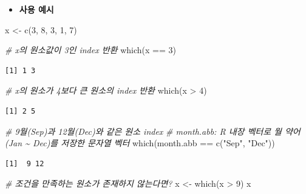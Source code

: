 \documentclass[
  11pt,
]{krantz}
\newenvironment{Shaded}{\begin{snugshade}}{\end{snugshade}}
\newcommand{\CommentTok}[1]{\textcolor[rgb]{0.37,0.37,0.37}{\textit{#1}}}
\newcommand{\DecValTok}[1]{\textcolor[rgb]{0.06,0.06,0.06}{#1}}
\newcommand{\FunctionTok}[1]{\textcolor[rgb]{0,0,0}{#1}}
\newcommand{\NormalTok}[1]{#1}
\newcommand{\OtherTok}[1]{\textcolor[rgb]{0.37,0.37,0.37}{#1}}
\newcommand{\SpecialCharTok}[1]{\textcolor[rgb]{0,0,0}{#1}}
\newcommand{\StringTok}[1]{\textcolor[rgb]{0.5,0.5,0.5}{#1}}
\providecommand{\tightlist}{%
  \setlength{\itemsep}{0pt}\setlength{\parskip}{0pt}}
\begin{document}
\normalsize

\begin{itemize}
\tightlist
\item
  \textbf{사용 예시}
\end{itemize}

\footnotesize

\begin{Shaded}
\begin{Highlighting}[]
\NormalTok{x }\OtherTok{\textless{}{-}} \FunctionTok{c}\NormalTok{(}\DecValTok{3}\NormalTok{, }\DecValTok{8}\NormalTok{, }\DecValTok{3}\NormalTok{, }\DecValTok{1}\NormalTok{, }\DecValTok{7}\NormalTok{)}

\CommentTok{\# x의 원소값이 3인 index 반환}
\FunctionTok{which}\NormalTok{(x }\SpecialCharTok{==} \DecValTok{3}\NormalTok{)}
\end{Highlighting}
\end{Shaded}

\begin{verbatim}
[1] 1 3
\end{verbatim}

\begin{Shaded}
\begin{Highlighting}[]
\CommentTok{\# x의 원소가 4보다 큰 원소의 index 반환}
\FunctionTok{which}\NormalTok{(x }\SpecialCharTok{\textgreater{}} \DecValTok{4}\NormalTok{)}
\end{Highlighting}
\end{Shaded}

\begin{verbatim}
[1] 2 5
\end{verbatim}

\begin{Shaded}
\begin{Highlighting}[]
\CommentTok{\# 9월(Sep)과 12월(Dec)와 같은 원소 index}
\CommentTok{\# month.abb: R 내장 벡터로 월 약어(Jan \textasciitilde{} Dec)를 저장한 문자열 벡터}
\FunctionTok{which}\NormalTok{(month.abb }\SpecialCharTok{==} \FunctionTok{c}\NormalTok{(}\StringTok{"Sep"}\NormalTok{, }\StringTok{"Dec"}\NormalTok{))}
\end{Highlighting}
\end{Shaded}

\begin{verbatim}
[1]  9 12
\end{verbatim}

\begin{Shaded}
\begin{Highlighting}[]
\CommentTok{\# 조건을 만족하는 원소가 존재하지 않는다면?}
\NormalTok{x }\OtherTok{\textless{}{-}} \FunctionTok{which}\NormalTok{(x }\SpecialCharTok{\textgreater{}} \DecValTok{9}\NormalTok{)}
\NormalTok{x}
\end{Highlighting}
\end{Shaded}
\end{document}
